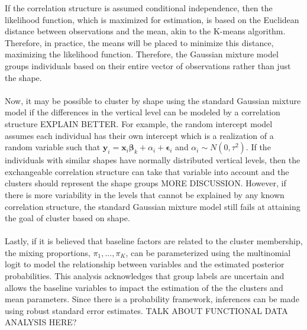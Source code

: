 \documentclass[12pt]{article}
\newcommand{\B}[0]{\mathbf}
\newcommand{\bs}[0]{\boldsymbol}
\begin{document}
If the correlation structure is assumed conditional independence, then the likelihood function, which is maximized for estimation, is based on the Euclidean distance between observations and the mean, akin to the K-means algorithm. Therefore, in practice, the means will be placed to minimize this distance, maximizing the likelihood function. Therefore, the Gaussian mixture model groups individuals based on their entire vector of observations rather than just the shape. \\\\
Now, it may be possible to cluster by shape using the standard Gaussian mixture model if the differences in the vertical level can be modeled by a correlation structure EXPLAIN BETTER. For example, the random intercept model assumes each individual has their own intercept which is a realization of a random variable such that $\B y_{i} = \B x_{i}\bs\beta_{k} + \alpha_{i}+\bs\epsilon_{i}$ and $\alpha_{i}\sim N(0,\tau^{2})$. If the individuals with similar shapes have normally distributed vertical levels, then the exchangeable correlation structure can take that variable into account and the clusters should represent the shape groups MORE DISCUSSION. However, if there is more variability in the levels that cannot be explained by any known correlation structure, the standard Gaussian mixture model still fails at attaining the goal of cluster based on shape. \\\\
Lastly, if it is believed that baseline factors are related to the cluster membership, the mixing proportions, $\pi_{1},...,\pi_{K}$, can be parameterized using the multinomial logit to model the relationship between variables and the estimated posterior probabilities. This analysis acknowledges that group labels are uncertain and allows the baseline variables to impact the estimation of the the clusters and mean parameters. Since there is a probability framework, inferences can be made using robust standard error estimates.
TALK ABOUT FUNCTIONAL DATA ANALYSIS HERE?
\end{document}
